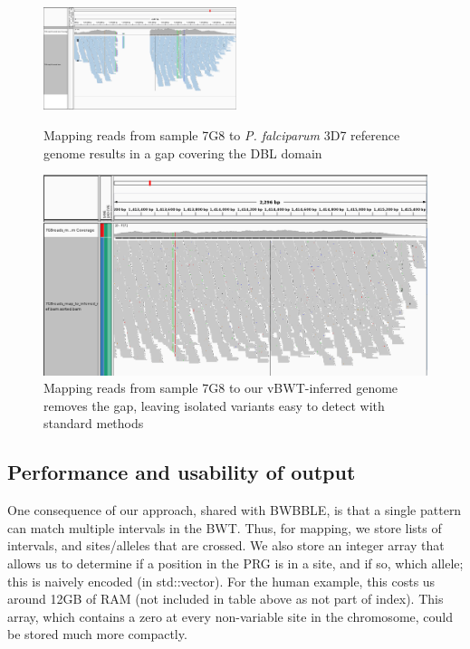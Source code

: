 \documentclass[runningheads,a4paper]{llncs}
\begin{document}
\begin{figure}[!tbp]
  \centering
  \begin{minipage}[b]{0.4\textwidth}
    \includegraphics[height=3cm]{7G8_to_3D7_pileup.png}
    \caption{Mapping reads from sample 7G8 to \textit{P. falciparum} 3D7 reference genome results in a gap covering the DBL domain}
  \end{minipage}
  \hfill
  \begin{minipage}[b]{0.45\textwidth}
    \includegraphics[width=\textwidth]{7G8_to_inf_ref_pileup.png}
    \caption{Mapping reads from sample 7G8 to our vBWT-inferred genome removes the gap, leaving isolated variants easy to detect with standard methods }
  \end{minipage}
\end{figure}






\subsection{Performance and usability of output}
One  consequence of our approach, shared with BWBBLE, is that a single pattern can match multiple intervals in the BWT. Thus, for mapping, we store lists of intervals, and sites/alleles  that are crossed. We also store an integer array that allows us to determine if a position in the PRG is in a site, and if so, which allele; this is naively encoded (in std::vector). For the human example, this costs us around 12GB of RAM (not included in table above as not part of index). This  array, which contains a zero at every non-variable site in the chromosome, could be stored much more compactly.
\end{document}
